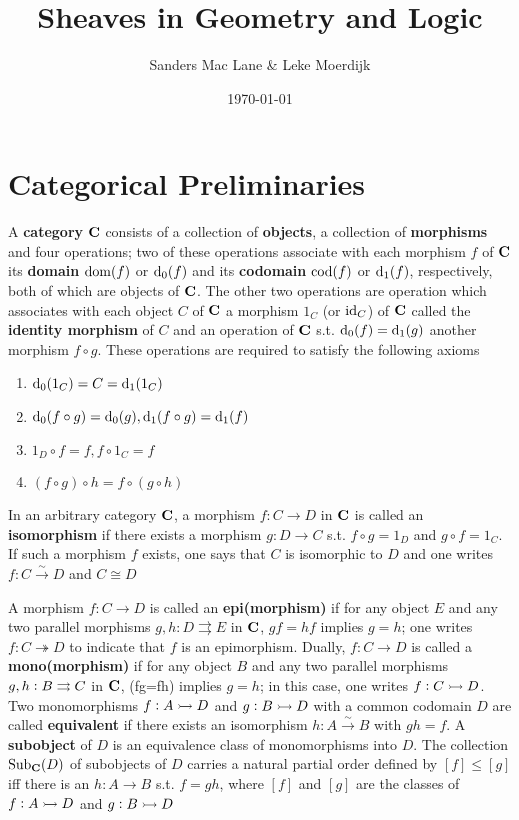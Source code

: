 \documentclass[11pt]{article}
\author{Sanders Mac Lane \& Leke Moerdijk}
\date{\today}
\title{\aunclfamily\Huge Sheaves in Geometry and Logic}
\begin{document}
\maketitle \clearpage
\tableofcontents \clearpage
\section{Categorical Preliminaries}
\label{sec:orgcea7c41}
A \textbf{category} \(\operatorname{\textbf{C}}\) consists of a collection of \textbf{objects}, a collection of
\textbf{morphisms} and four operations; two of these operations associate with each
morphism \(f\) of \(\operatorname{\textbf{C}}\) its \textbf{domain} \(\operatorname{dom}(f)\) or \(\operatorname{d}_0(f)\) and its
\textbf{codomain} \(\operatorname{cod}(f)\) or \(\operatorname{d}_1(f)\), respectively, both of which are objects of
\(\operatorname{\textbf{C}}\). The other two operations are operation which associates with each
object \(C\) of \(\operatorname{\textbf{C}}\) a morphism \(1_C\) (or \(\operatorname{id}_C\)) of \(\operatorname{\textbf{C}}\) called the
\textbf{identity morphism} of \(C\) and an operation of \(\operatorname{\textbf{C}}\) s.t.
\(\operatorname{d}_0(f)=\operatorname{d}_1(g)\) another morphism \(f\circ g\). These operations
are required to satisfy the following axioms
\begin{enumerate}
\item \(\operatorname{d}_0(1_C)=C=\operatorname{d}_1(1_C)\)
\item \(\operatorname{d}_0(f\circ g)=\operatorname{d}_0(g),\operatorname{d}_1(f\circ g)=\operatorname{d}_1(f)\)
\item \(1_D\circ f=f,f\circ 1_C=f\)
\item \((f\circ g)\circ h=f\circ(g\circ h)\)
\end{enumerate}


In an arbitrary category \(\operatorname{\textbf{C}}\), a morphism \(f:C\to D\) in \(\operatorname{\textbf{C}}\) is called
an \textbf{isomorphism} if there exists a morphism \(g:D\to C\) s.t. \(f\circ g=1_D\)
and \(g\circ f=1_C\). If such a morphism \(f\) exists, one says that \(C\) is
isomorphic to \(D\) and one writes \(f:C\xrightarrow{\sim}D\) and \(C\cong D\)

A morphism \(f:C\to D\) is called an \textbf{epi(morphism)} if for any object \(E\) and
any two parallel morphisms \(g,h:D\rightrightarrows E\) in \(\operatorname{\textbf{C}}\), \(gf=hf\)
implies \(g=h\); one writes \(f:C\twoheadrightarrow D\) to indicate that \(f\)
is an epimorphism. Dually, \(f:C\to D\) is called a \textbf{mono(morphism)} if for any
object \(B\) and any two parallel morphisms \(g,h:B\rightrightarrows C\) in \(\operatorname{\textbf{C}}\),
(fg=fh) implies \(g=h\); in this case, one writes \(f:C\rightarrowtail D\). Two
monomorphisms \(f:A\rightarrowtail D\) and \(g:B\rightarrowtail D\) with a common
codomain \(D\) are called \textbf{equivalent} if there exists an isomorphism
\(h:A\xrightarrow{\sim}B\) with \(gh=f\). A \textbf{subobject} of \(D\) is an equivalence
class of monomorphisms into \(D\). The collection \(\operatorname{Sub}_{\operatorname{\textbf{C}}}(D)\) of
subobjects of \(D\) carries a natural partial order defined by \([f]\le[g]\) iff
there is an \(h:A\to B\) s.t. \(f=gh\), where \([f]\) and \([g]\) are the
classes of \(f:A\rightarrowtail D\) and \(g:B\rightarrowtail D\)
\end{document}
